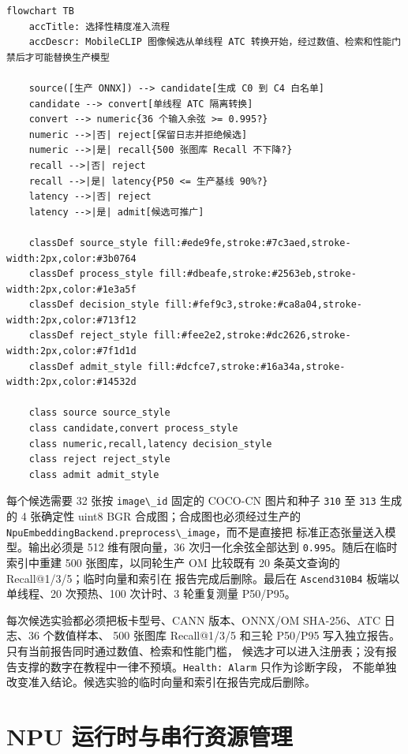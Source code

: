 \begin{lstlisting}
flowchart TB
    accTitle: 选择性精度准入流程
    accDescr: MobileCLIP 图像候选从单线程 ATC 转换开始，经过数值、检索和性能门禁后才可能替换生产模型

    source([生产 ONNX]) --> candidate[生成 C0 到 C4 白名单]
    candidate --> convert[单线程 ATC 隔离转换]
    convert --> numeric{36 个输入余弦 >= 0.995?}
    numeric -->|否| reject[保留日志并拒绝候选]
    numeric -->|是| recall{500 张图库 Recall 不下降?}
    recall -->|否| reject
    recall -->|是| latency{P50 <= 生产基线 90%?}
    latency -->|否| reject
    latency -->|是| admit[候选可推广]

    classDef source_style fill:#ede9fe,stroke:#7c3aed,stroke-width:2px,color:#3b0764
    classDef process_style fill:#dbeafe,stroke:#2563eb,stroke-width:2px,color:#1e3a5f
    classDef decision_style fill:#fef9c3,stroke:#ca8a04,stroke-width:2px,color:#713f12
    classDef reject_style fill:#fee2e2,stroke:#dc2626,stroke-width:2px,color:#7f1d1d
    classDef admit_style fill:#dcfce7,stroke:#16a34a,stroke-width:2px,color:#14532d

    class source source_style
    class candidate,convert process_style
    class numeric,recall,latency decision_style
    class reject reject_style
    class admit admit_style
\end{lstlisting}

每个候选需要 32 张按 \passthrough{\lstinline!image\_id!} 固定的 COCO-CN
图片和种子 \passthrough{\lstinline!310!} 至
\passthrough{\lstinline!313!} 生成的 4 张确定性 uint8 BGR
合成图；合成图也必须经过生产的
\passthrough{\lstinline!NpuEmbeddingBackend.preprocess\_image!}，而不是直接把
标准正态张量送入模型。输出必须是 512 维有限向量，36 次归一化余弦全部达到
\passthrough{\lstinline!0.995!}。随后在临时 索引中重建 500
张图库，以同轮生产 OM 比较既有 20 条英文查询的
Recall@1/3/5；临时向量和索引在 报告完成后删除。最后在
\passthrough{\lstinline!Ascend310B4!} 板端以单线程、20 次预热、100
次计时、3 轮重复测量 P50/P95。

每次候选实验都必须把板卡型号、CANN 版本、ONNX/OM SHA-256、ATC 日志、36
个数值样本、 500 张图库 Recall@1/3/5 和三轮 P50/P95
写入独立报告。只有当前报告同时通过数值、检索和性能门槛，
候选才可以进入注册表；没有报告支撑的数字在教程中一律不预填。\passthrough{\lstinline!Health: Alarm!}
只作为诊断字段，
不能单独改变准入结论。候选实验的临时向量和索引在报告完成后删除。

\section{NPU
运行时与串行资源管理}\label{npu-ux8fd0ux884cux65f6ux4e0eux4e32ux884cux8d44ux6e90ux7ba1ux7406}

